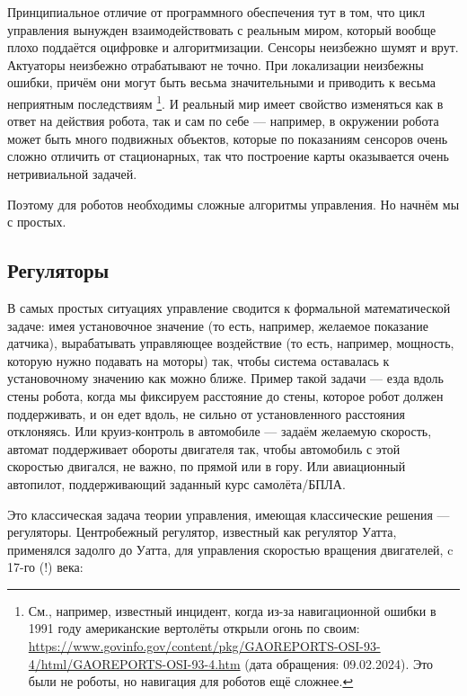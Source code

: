 \documentclass{../../text-style}
\begin{document}
Принципиальное отличие от программного обеспечения тут в том, что цикл управления вынужден взаимодействовать с реальным миром, который вообще плохо поддаётся оцифровке и алгоритмизации.
Сенсоры неизбежно шумят и врут.
Актуаторы неизбежно отрабатывают не точно.
При локализации неизбежны ошибки, причём они могут быть весьма значительными и приводить к весьма неприятным последствиям%
\footnote{См., например, известный инцидент, когда из-за навигационной ошибки в 1991 году американские вертолёты открыли огонь по своим: \url{https://www.govinfo.gov/content/pkg/GAOREPORTS-OSI-93-4/html/GAOREPORTS-OSI-93-4.htm} (дата обращения: 09.02.2024). Это были не роботы, но навигация для роботов ещё сложнее.}.
И реальный мир имеет свойство изменяться как в ответ на действия робота, так и сам по себе --- например, в окружении робота может быть много подвижных объектов, которые по показаниям сенсоров очень сложно отличить от стационарных, так что построение карты оказывается очень нетривиальной задачей.

Поэтому для роботов необходимы сложные алгоритмы управления.
Но начнём мы с простых.

\subsection{Регуляторы}

В самых простых ситуациях управление сводится к формальной математической задаче: имея установочное значение (то есть, например, желаемое показание датчика), вырабатывать управляющее воздействие (то есть, например, мощность, которую нужно подавать на моторы) так, чтобы система оставалась к установочному значению как можно ближе.
Пример такой задачи --- езда вдоль стены робота, когда мы фиксируем расстояние до стены, которое робот должен поддерживать, и он едет вдоль, не сильно от установленного расстояния отклоняясь.
Или круиз-контроль в автомобиле --- задаём желаемую скорость, автомат поддерживает обороты двигателя так, чтобы автомобиль с этой скоростью двигался, не важно, по прямой или в гору.
Или авиационный автопилот, поддерживающий заданный курс самолёта/БПЛА.

Это классическая задача теории управления, имеющая классические решения --- регуляторы. 
Центробежный регулятор, известный как регулятор Уатта, применялся задолго до Уатта, для управления скоростью вращения двигателей, c 17-го (!) века:
\end{document}
